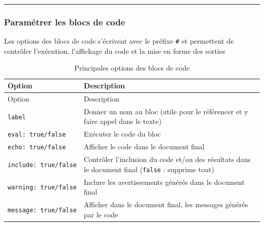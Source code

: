\documentclass[
  french,
  10pt,
  a4paper,
]{article}
\begin{document}
\begin{center}\rule{0.5\linewidth}{0.5pt}\end{center}

\subsubsection{Paramétrer les blocs de
code}\label{paramuxe9trer-les-blocs-de-code}

Les options des blocs de code s'écrivent avec le préfixe
\texttt{\#\textbar{}} et permettent de contrôler l'exécution,
l'affichage du code et la mise en forme des sorties

\begin{longtable}[]{@{}
  >{\raggedright\arraybackslash}p{}
  >{\raggedright\arraybackslash}p{}@{}}
\caption{Principales options des blocs de code}\tabularnewline
\toprule\noalign{}
\begin{minipage}[b]{\linewidth}\raggedright
Option
\end{minipage} & \begin{minipage}[b]{\linewidth}\raggedright
Description
\end{minipage} \\
\midrule\noalign{}
\endfirsthead
\toprule\noalign{}
\begin{minipage}[b]{\linewidth}\raggedright
Option
\end{minipage} & \begin{minipage}[b]{\linewidth}\raggedright
Description
\end{minipage} \\
\midrule\noalign{}
\endhead
\bottomrule\noalign{}
\endlastfoot
\texttt{label} & Donner un nom au bloc (utile pour le référencer et y
faire appel dans le texte) \\
\texttt{eval:\ true/false} & Exécuter le code du bloc \\
\texttt{echo:\ true/false} & Afficher le code dans le document final \\
\texttt{include:\ true/false} & Contrôler l'inclusion du code et/ou des
résultats dans le document final (\texttt{false} : supprime tout) \\
\texttt{warning:\ true/false} & Inclure les avertissements générés dans
le document final \\
\texttt{message:\ true/false} & Afficher dans le document final, les
messages générés par le code \\
\end{longtable}
\end{document}
